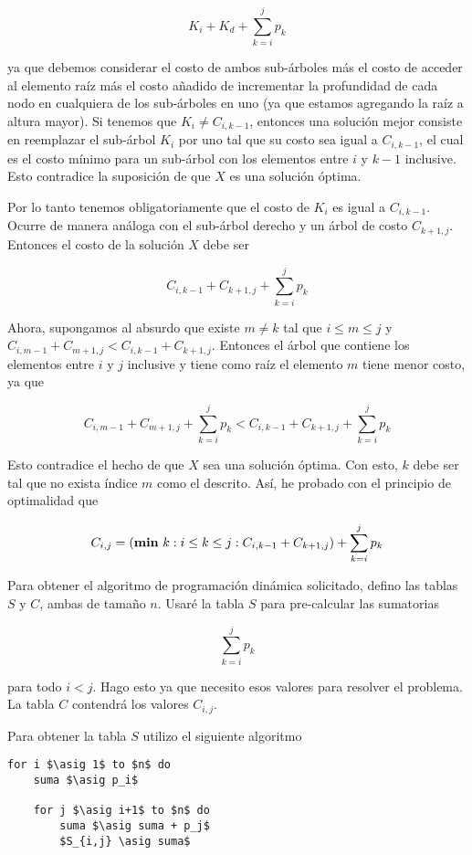 \documentclass{article}
\newcommand{\asig}{\ensuremath{\leftarrow}}
\begin{document}
$$
K_i + K_d + \sum_{k=i}^j p_k
$$

ya que debemos considerar el costo de ambos sub-árboles más el costo de acceder al
elemento raíz más el costo añadido de incrementar la profundidad de cada nodo en
cualquiera de los sub-árboles en uno (ya que estamos agregando la raíz a altura mayor).
Si tenemos que $K_i \neq C_{i,k-1}$, entonces una solución mejor consiste en reemplazar
el sub-árbol $K_i$ por uno tal que su costo sea igual a $C_{i,k-1}$, el cual es el costo
mínimo para un sub-árbol con los elementos entre $i$ y $k-1$ inclusive. Esto contradice
la suposición de que $X$ es una solución óptima.

Por lo tanto tenemos obligatoriamente que el costo de $K_i$ es igual a $C_{i,k-1}$.
Ocurre de manera análoga con el sub-árbol derecho y un árbol de costo $C_{k+1,j}$.
Entonces el costo de la solución $X$ debe ser 

$$
C_{i,k-1} + C_{k+1,j} + \sum_{k=i}^j p_k
$$

Ahora, supongamos al absurdo que existe $m \neq k$ tal que $i \leq m \leq j$ y
$C_{i,m-1}+C_{m+1,j} < C_{i,k-1}+C_{k+1,j}$. Entonces el árbol que contiene los
elementos entre $i$ y $j$ inclusive y tiene como raíz el elemento $m$ tiene menor
costo, ya que 

$$
C_{i,m-1} + C_{m+1,j} + \sum_{k=i}^j p_k < C_{i,k-1} + C_{k+1,j} + \sum_{k=i}^j p_k
$$

Esto contradice el hecho de que $X$ sea una solución óptima. Con esto, $k$ debe ser tal que
no exista índice $m$ como el descrito. Así, he probado con el principio de optimalidad
que

$$
C_{i,j} = (\text{{\bf min} } k : i \leq k \leq j : C_{i,k-1} + C_{k+1,j}) + \sum_{k=i}^j p_k
$$

Para obtener el algoritmo de programación dinámica solicitado,
defino las tablas $S$ y $C$, ambas de tamaño $n$. Usaré la tabla $S$ para pre-calcular las sumatorias

$$
\sum_{k=i}^j p_k
$$

para todo $i < j$. Hago esto ya que necesito esos valores para resolver el problema. La tabla $C$ contendrá
los valores $C_{i,j}$.

Para obtener la tabla $S$ utilizo el siguiente algoritmo

\begin{lstlisting}[caption={Cálculo de la tabla S},label=alg:tablaS]
for i $\asig 1$ to $n$ do
    suma $\asig p_i$

    for j $\asig i+1$ to $n$ do
        suma $\asig suma + p_j$
        $S_{i,j} \asig suma$
\end{lstlisting}
\end{document}
